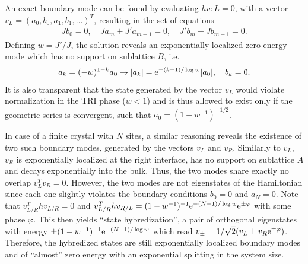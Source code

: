 An exact boundary mode can be found by evaluating $hv:L=0$, with a vector $v_L = (a_0,b_0,a_1,b_1,\dots)^T$, resulting in the set of equations
\begin{align}
    J b_0 = 0,
    \quad
    Ja_m + J' a_{m+1} = 0,
    \quad
    J' b_m + J b_{m+1} = 0.
\end{align}
Defining $w=J'/J$, the solution reveals an exponentially localized zero energy mode which has no support on sublattice $B$, i.e.
\begin{align}
    a_k=(-w)^{1-k} a_0 \rightarrow |a_k| = \mathrm e^{-(k-1)/\log w}|a_0|,
    \quad
    b_k = 0.
    \label{eq:boundary_mode}
\end{align}
It is also transparent that the state generated by the vector $v_L$ would violate normalization in the TRI phase ($w<1$) and is thus allowed to exist only if the geometric series is convergent, such that $a_0 = (1-w^{-1})^{-1/2}$.

In case of a finite crystal with $N$ sites, a similar reasoning reveals the existence of two such boundary modes, generated by the vectors $v_L$ and $v_R$.
Similarly to $v_L$, $v_R$ is exponentially localized at the right interface, has no support on sublattice $A$ and decays exponentially into the bulk.
Thus, the two modes share exactly no overlap $v_L^T v_R = 0$.
However, the two modes are not eigenstates of the Hamiltonian since each one slightly violates the boundary conditions $b_0=0$ and $a_N=0$.
Note that $v_{L/R}^T h v_{L/R} = 0$ and $v_{L/R}^T h v_{R/L} = (1-w^{-1})^{-1}\mathrm e^{-(N-1)/\log w}\mathrm e^{\pm\varphi}$ with some phase $\varphi$.
This then yields ``state hybredization'', a pair of orthogonal eigenstates with energy $\pm(1-w^{-1})^{-1}\mathrm e^{-(N-1)/\log w}$ which read $v_\pm = 1/\sqrt2(v_L \pm v_R\mathrm e^{\pm\varphi})$.
Therefore, the hybredized states are still exponentially localized boundary modes and of ``almost'' zero energy with an exponential splitting in the system size.
%
%
